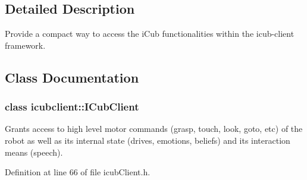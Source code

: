 \subsection{Detailed Description}
Provide a compact way to access the i\+Cub functionalities within the icub-\/client framework. 



\subsection{Class Documentation}
\label{classicubclient_1_1ICubClient}
\subsubsection{class icubclient\+:\+:I\+Cub\+Client}
Grants access to high level motor commands (grasp, touch, look, goto, etc) of the robot as well as its internal state (drives, emotions, beliefs) and its interaction means (speech). 

Definition at line 66 of file icub\+Client.\+h.

